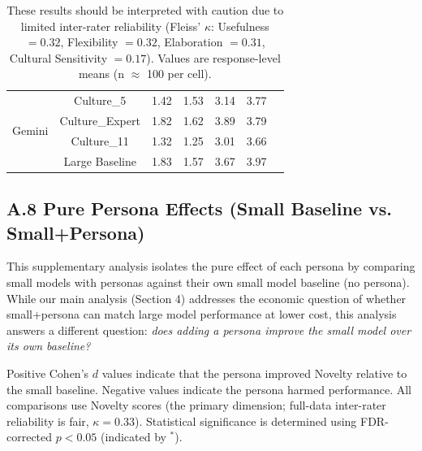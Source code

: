 \documentclass{article}
\begin{document}
\begin{table}[H]
\begin{tabular}{lcccccc}
\midrule
\multirow{4}{*}{Gemini} & Culture\_5 & 1.42 & 1.53 & 3.14 & 3.77 \\
 & Culture\_Expert & 1.82 & 1.62 & 3.89 & 3.79 \\
 & Culture\_11 & 1.32 & 1.25 & 3.01 & 3.66 \\
 & Large Baseline & 1.83 & 1.57 & 3.67 & 3.97 \\
\bottomrule
\end{tabular}
\caption*{\footnotesize These results should be interpreted with caution due to limited inter-rater reliability (Fleiss' $\kappa$: Usefulness $= 0.32$, Flexibility $= 0.32$, Elaboration $= 0.31$, Cultural Sensitivity $= 0.17$). Values are response-level means (n $\approx$ 100 per cell).}
\end{table}

\newpage
\subsection*{A.8 Pure Persona Effects (Small Baseline vs. Small+Persona)}

This supplementary analysis isolates the pure effect of each persona by comparing 
small models with personas against their own small model baseline (no persona). 
While our main analysis (Section 4) addresses the economic question of whether 
small+persona can match large model performance at lower cost, this analysis 
answers a different question: \textit{does adding a persona improve the small 
model over its own baseline?}

Positive Cohen's \(d\) values indicate that the persona improved Novelty relative 
to the small baseline. Negative values indicate the persona harmed performance. 
All comparisons use Novelty scores (the primary dimension; full-data inter-rater 
reliability is fair, \(\kappa = 0.33\)). Statistical significance is determined using 
FDR-corrected \(p < 0.05\) (indicated by \(^*\)).
\end{document}
